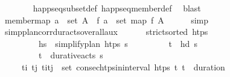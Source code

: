 \begin{isabellebody}
\ \ \ \ \ \ \isamarkupfalse%
\ happ{\isacharunderscore}{\kern0pt}seq{\isacharunderscore}{\kern0pt}subset{\isacharunderscore}{\kern0pt}def\ happ{\isacharunderscore}{\kern0pt}seq{\isacharunderscore}{\kern0pt}member{\isacharunderscore}{\kern0pt}def\ \isamarkupfalse%
\ blast\isanewline
\ \ \isamarkupfalse%
%
\endisatagproof
{\isafoldproof}%
%
\isadelimproof
\isanewline
%
\endisadelimproof
\isanewline
\ \ \isanewline
\ \ \isamarkupfalse%
\ member{\isacharunderscore}{\kern0pt}map{\isacharcolon}{\kern0pt}\ {\isachardoublequoteopen}a\ {\isasymin}\ set\ A\ {\isasymLongrightarrow}\ f\ a\ {\isasymin}\ set\ {\isacharparenleft}{\kern0pt}map\ f\ A{\isacharparenright}{\kern0pt}{\isachardoublequoteclose}\isanewline
%
\isadelimproof
\ \ \ \ %
\endisadelimproof
%
\isatagproof
{}\isamarkupfalse%
\ simp%
\endisatagproof
{\isafoldproof}%
%
\isadelimproof
\isanewline
%
\endisadelimproof
\isanewline
\ \ \isamarkupfalse%
\ simp{\isacharunderscore}{\kern0pt}plan{\isacharunderscore}{\kern0pt}corr{\isacharunderscore}{\kern0pt}dur{\isacharunderscore}{\kern0pt}acts{\isacharunderscore}{\kern0pt}overall{\isacharunderscore}{\kern0pt}aux{\isacharcolon}{\kern0pt}\ \isanewline
\ \ \ \ \ {\isachardoublequoteopen}strict{\isacharunderscore}{\kern0pt}sorted\ htps{\isachardoublequoteclose}\isanewline
\ \ \ \ \ \ \ \ \ {\isachardoublequoteopen}hs\ {\isacharequal}{\kern0pt}\ simplify{\isacharunderscore}{\kern0pt}plan\ htps\ {\isasympi}s{\isachardoublequoteclose}\isanewline
\ \ \ \ \ \ \ \ \ {\isachardoublequoteopen}{\isacharparenleft}{\kern0pt}t\isactrlsub {\isasympi}{\isacharcomma}{\kern0pt}{\isasympi}{\isacharparenright}{\kern0pt}\ {\isacharequal}{\kern0pt}\ hd\ {\isasympi}s{\isachardoublequoteclose}\ \isanewline
\ \ \ \ \ \ \ \ \ {\isachardoublequoteopen}{\isacharparenleft}{\kern0pt}t\isactrlsub {\isasympi}{\isacharcomma}{\kern0pt}{\isasympi}{\isacharparenright}{\kern0pt}\ {\isasymin}\ durative{\isacharunderscore}{\kern0pt}acts\ {\isasympi}s{\isachardoublequoteclose}\isanewline
\ \ \ \ \ {\isachardoublequoteopen}{\isasymforall}t\isactrlsub i\ t\isactrlsub j{\isachardot}{\kern0pt}\ {\isacharparenleft}{\kern0pt}t\isactrlsub i{\isacharcomma}{\kern0pt}t\isactrlsub j{\isacharparenright}{\kern0pt}\ {\isasymin}\ set\ {\isacharparenleft}{\kern0pt}consec{\isacharunderscore}{\kern0pt}htps{\isacharunderscore}{\kern0pt}in{\isacharunderscore}{\kern0pt}interval\ htps\ t\isactrlsub {\isasympi}\ {\isacharparenleft}{\kern0pt}t\isactrlsub {\isasympi}\ {\isacharplus}{\kern0pt}\ duration\ {\isasympi}{\isacharparenright}{\kern0pt}{\isacharparenright}{\kern0pt}\ {\isasymlongrightarrow}\isanewline

\end{isabellebody}
